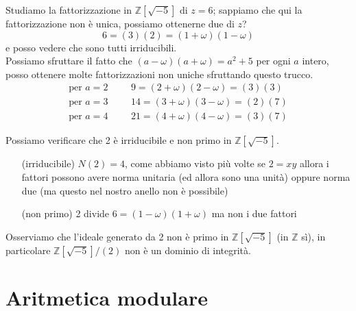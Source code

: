 \begin{esercizio}
	Studiamo la fattorizzazione in $\mathbb{Z}[\sqrt{-5}]$ di $z=6$; sappiamo che qui la fattorizzazione non è unica, possiamo ottenerne due di $z$?
	\begin{equation*}
	6 =(3)(2) =(1+\omega)(1-\omega)
	\end{equation*}
	e posso vedere che sono tutti irriducibili. \\ Possiamo sfruttare il fatto che $(a-\omega)(a+\omega)=a^2+5$ per ogni $a$ intero, posso ottenere molte fattorizzazioni non uniche sfruttando questo trucco.
	\begin{equation*}
		\begin{array}{lllr}
			\text{per $a=2$} & & &
				9=(2+\omega)(2-\omega)=(3)(3)\\
			\text{per $a=3$} & & &
				14=(3+\omega)(3-\omega)=(2)(7)\\
			\text{per $a=4$} & & &
				21=(4+\omega)(4-\omega)=(3)(7)		
		\end{array}
	\end{equation*}
\end{esercizio}
\begin{esercizio}
	Possiamo verificare che 2 è irriducibile e non primo in $\mathbb{Z}[\sqrt{-5}]$. 
	\begin{itemize}
		\item[(irriducibile)] $N(2)=4$, come abbiamo visto più volte se $2=xy$ allora i fattori possono avere norma unitaria (ed allora sono una unità) oppure norma due (ma questo nel nostro anello non è possibile)
		\item[(non primo)] 2 divide $6=(1-\omega)(1+\omega)$ ma non i due fattori
	\end{itemize}
Osserviamo che l'ideale generato da 2 non è primo in $\mathbb{Z}[\sqrt{-5}]$ (in $\mathbb{Z}$ sì), in particolare $\mathbb{Z}[\sqrt{-5}]/(2)$ non è un dominio di integrità.
\end{esercizio}




\section{Aritmetica modulare}
\label{lezione6}
